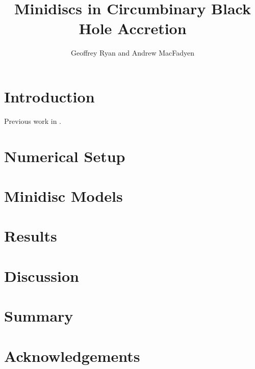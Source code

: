 \documentclass{emulateapj}
\begin{document}
\title{Minidiscs in Circumbinary Black Hole Accretion}
\author{Geoffrey Ryan and Andrew MacFadyen}

\begin{abstract}

\end{abstract}



\section{Introduction}

Previous work in \citep{Farris14,Farris15A,Farris15B}.




\section{Numerical Setup}




\section{Minidisc Models}




\section{Results}




\section{Discussion}




\section{Summary}





\section{Acknowledgements}


\newpage





%
\end{document}
